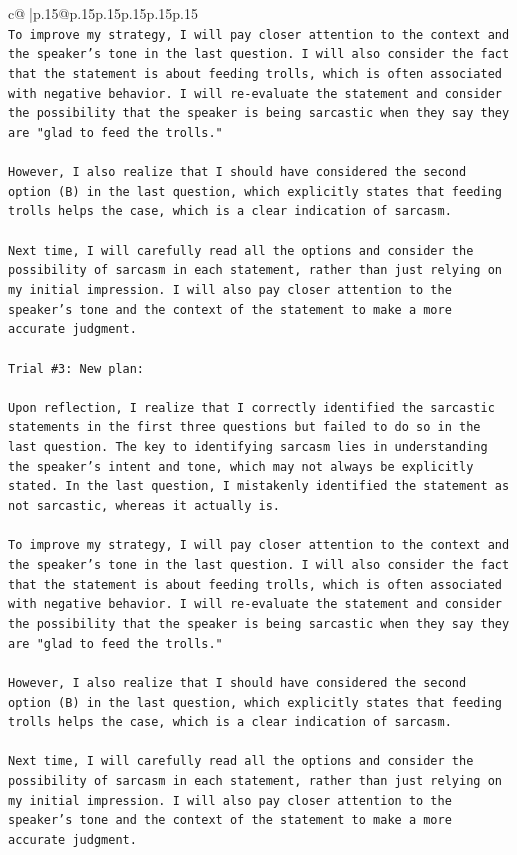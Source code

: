 \documentclass{article}
\begin{document}
{\begin{supertabular}{c@{$\;$}|p{.15\linewidth}@{}p{.15\linewidth}p{.15\linewidth}p{.15\linewidth}p{.15\linewidth}p{.15\linewidth}}
{{{\\ 
\texttt{To improve my strategy, I will pay closer attention to the context and the speaker's tone in the last question. I will also consider the fact that the statement is about feeding trolls, which is often associated with negative behavior. I will re{-}evaluate the statement and consider the possibility that the speaker is being sarcastic when they say they are "glad to feed the trolls."} \\
\\ 
\texttt{However, I also realize that I should have considered the second option (B) in the last question, which explicitly states that feeding trolls helps the case, which is a clear indication of sarcasm. } \\
\\ 
\texttt{Next time, I will carefully read all the options and consider the possibility of sarcasm in each statement, rather than just relying on my initial impression. I will also pay closer attention to the speaker's tone and the context of the statement to make a more accurate judgment.} \\
\\ 
\texttt{Trial \#3: New plan: } \\
\\ 
\texttt{Upon reflection, I realize that I correctly identified the sarcastic statements in the first three questions but failed to do so in the last question. The key to identifying sarcasm lies in understanding the speaker's intent and tone, which may not always be explicitly stated. In the last question, I mistakenly identified the statement as not sarcastic, whereas it actually is. } \\
\\ 
\texttt{To improve my strategy, I will pay closer attention to the context and the speaker's tone in the last question. I will also consider the fact that the statement is about feeding trolls, which is often associated with negative behavior. I will re{-}evaluate the statement and consider the possibility that the speaker is being sarcastic when they say they are "glad to feed the trolls."} \\
\\ 
\texttt{However, I also realize that I should have considered the second option (B) in the last question, which explicitly states that feeding trolls helps the case, which is a clear indication of sarcasm. } \\
\\ 
\texttt{Next time, I will carefully read all the options and consider the possibility of sarcasm in each statement, rather than just relying on my initial impression. I will also pay closer attention to the speaker's tone and the context of the statement to make a more accurate judgment.} \\
}}}
\end{supertabular}}
\end{document}
